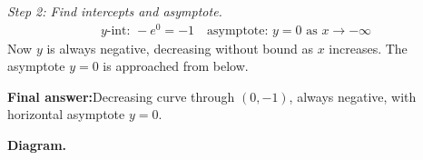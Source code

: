 \documentclass[11pt]{article}
\begin{document}
\textit{Step 2: Find intercepts and asymptote.}
\[\begin{gathered}
y\text{-int: } -e^{0} = -1 \quad \text{asymptote: } y = 0 \text{ as } x \to -\infty
\end{gathered}\]
Now \( y \) is always negative, decreasing without bound as \( x \) increases. The asymptote \( y = 0 \) is approached from below.

\begin{answerbox}
\textbf{Final answer:}\quad Decreasing curve through \(\displaystyle (0, -1)\), always negative, with horizontal asymptote \(\displaystyle  y = 0 \).
\end{answerbox}
\textbf{Diagram.}

\begin{center}
\end{center}
\end{document}
